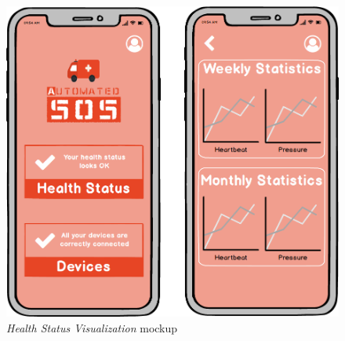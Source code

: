 \begin{figure}[H]
\begin{center}
  \includegraphics[width=\textwidth]{img/mockup/Health_Status.png}
  \hspace{0.05\linewidth}
  \centering
  \caption{\textit{Health Status Visualization} mockup}
  \label{img:healthStatusMockup}
\end{center}
\end{figure}
